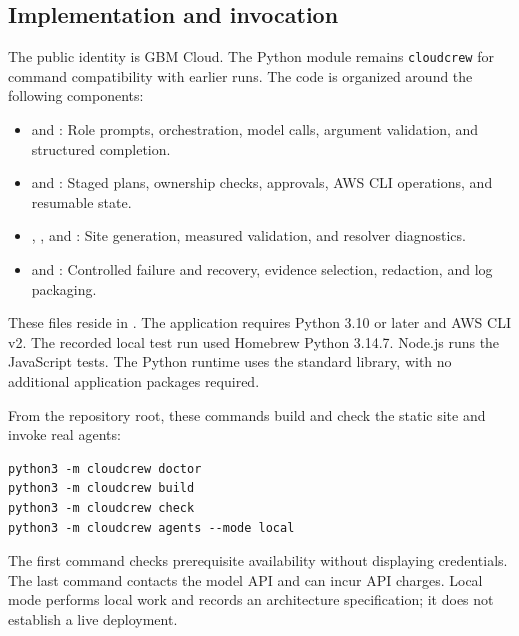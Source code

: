 \documentclass[11pt]{article}
\begin{document}
\subsection{Implementation and invocation}
The public identity is GBM Cloud. The Python module remains \texttt{cloudcrew} for command compatibility with earlier runs. The code is organized around the following components:
\begin{itemize}
  \item {} and : Role prompts, orchestration, model calls, argument validation, and structured completion.
  \item {} and : Staged plans, ownership checks, approvals, AWS CLI operations, and resumable state.
  \item {}, , and : Site generation, measured validation, and resolver diagnostics.
  \item {} and : Controlled failure and recovery, evidence selection, redaction, and log packaging.
\end{itemize}
These files reside in . The application requires Python 3.10 or later and AWS CLI v2. The recorded local test run used Homebrew Python 3.14.7. Node.js runs the JavaScript tests. The Python runtime uses the standard library, with no additional application packages required.

From the repository root, these commands build and check the static site and invoke real agents:
\begin{lstlisting}
python3 -m cloudcrew doctor
python3 -m cloudcrew build
python3 -m cloudcrew check
python3 -m cloudcrew agents --mode local
\end{lstlisting}
The first command checks prerequisite availability without displaying credentials. The last command contacts the model API and can incur API charges. Local mode performs local work and records an architecture specification; it does not establish a live deployment.
\end{document}
